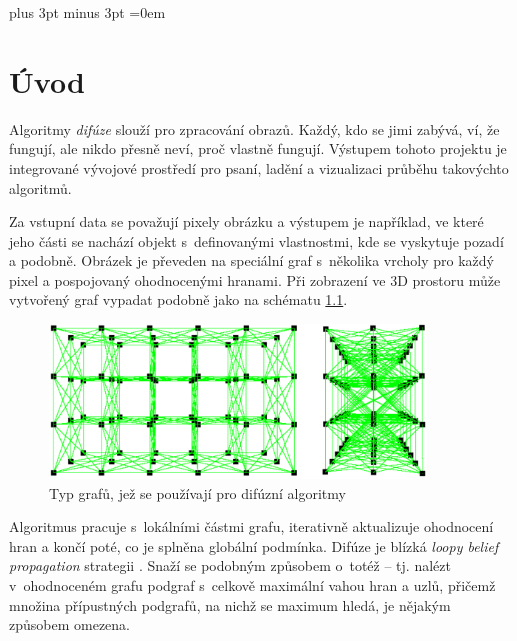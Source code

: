 \documentclass[11pt,twoside,a4paper]{book}
\begin{document}

\cleardoublepage

\tableofcontents
\listoffigures
\listoftables



\mainbodystarts

\parskip=5pt plus 3pt minus 3pt
\parindent=0em



\chapter{Úvod}

Algoritmy \textit{difúze} \cite{werner} slouží pro zpracování obrazů. Každý, kdo se jimi zabývá, ví, že fungují, ale nikdo přesně neví, proč vlastně fungují. Výstupem tohoto projektu je integrované vývojové prostředí pro psaní, ladění a vizualizaci průběhu takovýchto algoritmů.

Za vstupní data se považují pixely obrázku a výstupem je například, ve které jeho části se nachází objekt s~definovanými vlastnostmi, kde se vyskytuje pozadí a podobně. Obrázek je převeden na speciální graf s~několika vrcholy pro každý pixel a pospojovaný ohodnocenými hranami. Při zobrazení ve 3D prostoru může vytvořený graf vypadat podobně jako na schématu \ref{fig:graf_difuze}.

\begin{figure}[ht]
\begin{center}
\includegraphics[width=10cm]{img/graf_difuze.pdf}
\caption{Typ grafů, jež se používají pro difúzní algoritmy}
\label{fig:graf_difuze}
\end{center}
\end{figure}

Algoritmus pracuje s~lokálními částmi grafu, iterativně aktualizuje ohodnocení hran a končí poté, co je splněna globální podmínka. Difúze je blízká \textit{loopy belief propagation} strategii \cite{belief_propagation}. Snaží se podobným způsobem o~totéž -- tj. nalézt v~ohodnoceném grafu podgraf s~celkově maximální vahou hran a uzlů, přičemž množina přípustných podgrafů, na nichž se maximum hledá, je nějakým způsobem omezena.
\end{document}
